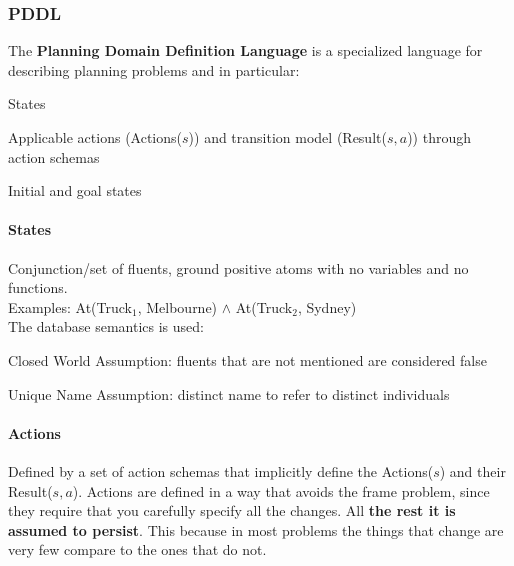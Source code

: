 \documentclass[10pt]{report}
\begin{document}
\subsubsection{PDDL} The \textbf{Planning Domain Definition Language} is a specialized language for describing planning problems and in particular:\begin{list}{}{}
	\item States
	\item Applicable actions (Actions($s$)) and transition model (Result($s,a$)) through action schemas
	\item Initial and goal states
\end{list}
\paragraph{States} Conjunction/set of fluents, ground positive atoms with no variables and no functions.\\Examples: At(Truck$_1$, Melbourne) $\wedge$ At(Truck$_2$, Sydney)\\
The database semantics is used:
\begin{list}{}{}
	\item Closed World Assumption: fluents that are not mentioned are considered false
	\item Unique Name Assumption: distinct name to refer to distinct individuals
\end{list}
\paragraph{Actions} Defined by a set of action schemas that implicitly define the Actions($s$) and their Result($s,a$). Actions are defined in a way that avoids the frame problem, since they require that you carefully specify all the changes. All \textbf{the rest it is assumed to persist}. This because in most problems the things that change are very few compare to the ones that do not.
\end{document}
